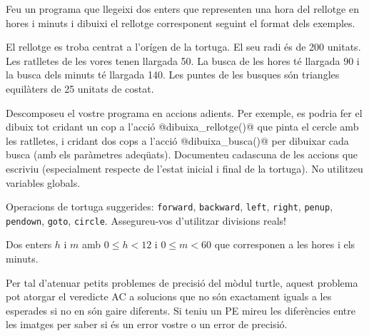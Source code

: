 

\Statement

Feu un programa que llegeixi dos enters que representen una hora del rellotge en hores i minuts i dibuixi el rellotge corresponent seguint el format dels exemples.

\medskip

El rellotge es troba centrat a l'orígen de la tortuga. El seu radi és de 200 unitats. Les ratlletes de les vores tenen llargada 50. La busca de les hores té llargada 90 i la busca dels minuts té llargada 140. Les puntes de les busques són triangles equilàters de 25 unitats de costat.

\medskip

Descomposeu el vostre programa en accions adients. Per exemple, es podria fer el dibuix tot cridant un cop a l'acció @dibuixa_rellotge()@ que pinta el cercle amb les ratlletes, i cridant dos cops a l'acció @dibuixa_busca()@ per dibuixar cada busca (amb els paràmetres adeqüats). Documenteu cadascuna de les accions que escriviu (especialment respecte de l'estat inicial i final de la tortuga). No utilitzeu variables globals.

\medskip

Operacions de tortuga suggerides: 
\texttt{forward},
\texttt{backward},
\texttt{left},
\texttt{right},
\texttt{penup},
\texttt{pendown},
\texttt{goto},
\texttt{circle}.
Assegureu-vos d'utilitzar divisions reals!

\Input 

Dos enters $h$ i $m$ amb $0\le h <12$ i $0\le m<60$ que corresponen a les hores i els minuts.

\Observation

Per tal d'atenuar petits problemes de precisió del mòdul turtle, aquest
problema pot atorgar el veredicte AC a solucions que no són exactament
iguals a les esperades si no en són gaire diferents. Si teniu un PE mireu
les diferències entre les imatges per saber si és un error vostre o un error
de precisió.

\Sample

